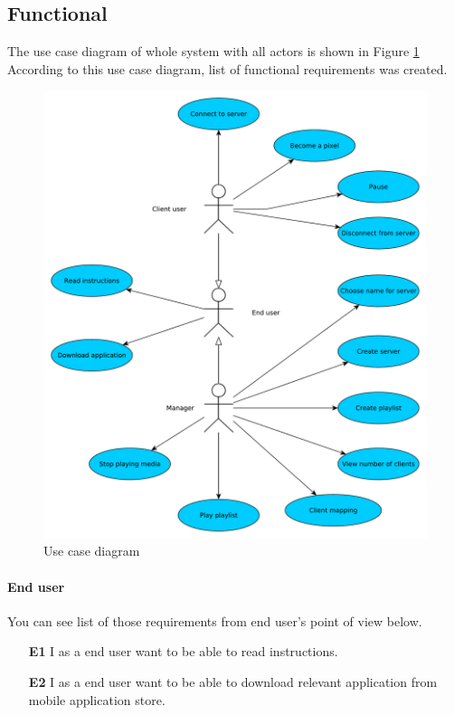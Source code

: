 \subsection{Functional}
The use case diagram of whole system with all actors is shown in Figure \ref{img:usecase}
According to this use case diagram, list of functional requirements was created.

\begin{figure}[h!]
    \begin{center}
    \includegraphics[scale=0.45]{images/usecase.pdf}
    \caption{Use case diagram}
    \label{img:usecase}
    \end{center}
\end{figure}

\paragraph{End user} You can see list of those requirements from end user's point of view below.

\begin{enumerate}
	\item[\textbf{E1}] \label{req_E1}
		I as a end user want to be able to read instructions.
	\item[\textbf{E2}] \label{req_E2}
		I as a end user want to be able to download relevant application from mobile application store.
\end{enumerate}

